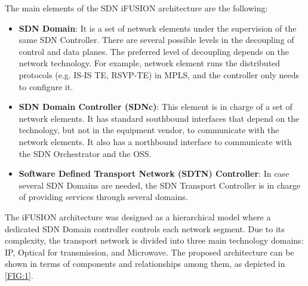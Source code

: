 \documentclass[10pt, conference]{IEEEtran}
\begin{document}
The main elements of the SDN i\uppercase{FUSION} architecture are the following:

\begin{itemize}
\item \textbf{SDN Domain}: It is a set of network elements under the supervision of the same SDN Controller. There are several possible levels in the decoupling of control and data planes. The preferred level of decoupling depends on the network technology. For example, network element runs the distributed protocols (e.g. IS-IS TE, RSVP-TE) in MPLS, and the controller only needs to configure it.


\item \textbf{SDN Domain Controller (SDNc)}: This element is in charge of a set of network elements. It has standard southbound interfaces that depend on the technology, but not in the equipment vendor, to communicate with the network elements. It also has a northbound interface to communicate with the SDN Orchestrator and the OSS.

\item \textbf{Software Defined Transport Network (SDTN) Controller}: In case several SDN Domains are needed, the SDN Transport Controller is in charge of providing services through several domains. 


\end{itemize}

The i\uppercase{FUSION} architecture was designed as a hierarchical model where a dedicated SDN Domain controller controls each network segment. Due to its complexity, the transport network is divided into three main technology domains: IP, Optical for transmission, and Microwave.  The proposed architecture can be shown in terms of components and relationships among them, as depicted in \cref{FIG:1}. 
\end{document}
